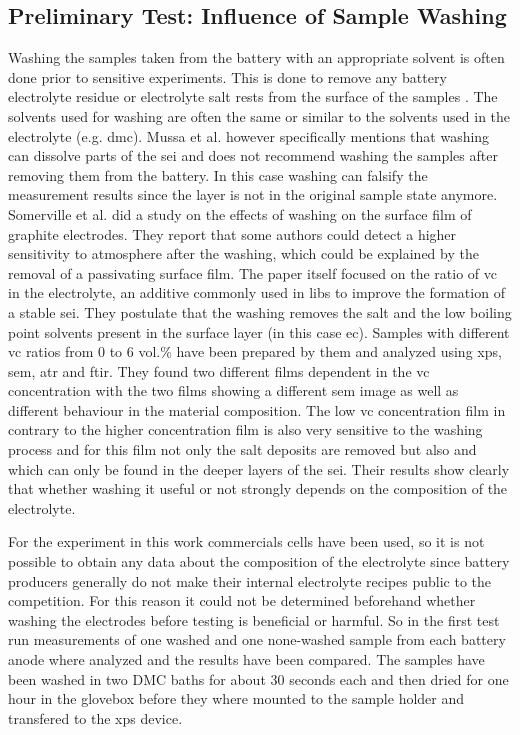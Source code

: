 \subsection{Preliminary Test: Influence of Sample Washing} 
Washing the samples taken from the battery with an appropriate solvent is often done prior to sensitive experiments. This is done to remove any battery electrolyte residue or electrolyte salt rests from the surface of the samples \cite{Yang.2010}. The solvents used for washing are often the same or similar to the solvents used in the electrolyte (e.g. \gls{dmc}). Mussa et al. however specifically mentions that washing can dissolve parts of the \gls{sei} and  does not recommend washing the samples after removing them from the battery. In this case washing can falsify the measurement results since the layer is not in the original sample state anymore. Somerville et al. \cite{Somerville.2016} did a study on the effects of washing on the surface film of graphite electrodes. They report that some authors could detect a higher sensitivity to atmosphere after the washing, which could be explained by the removal of a passivating surface film. The paper itself focused on the ratio of \gls{vc} in the electrolyte, an additive commonly used in \glspl{lib} to improve the formation of a stable \gls{sei}. They postulate that the washing removes the salt and the low boiling point solvents present in the surface layer (in this case \gls{ec}). Samples with different \gls{vc} ratios from 0 to 6 vol.\% have been prepared by them and analyzed using \gls{xps}, \gls{sem}, \gls{atr} and \gls{ftir}. They found two different films dependent in the \gls{vc} concentration with the two films showing a different \gls{sem} image as well as different behaviour in the material composition. The low \gls{vc} concentration film in contrary to the higher concentration film is also very sensitive to the washing process and for this film not only the salt deposits are removed but also  and  which can only be found in the deeper layers of the \gls{sei}. Their results show clearly that whether washing it useful or not strongly depends on the composition of the electrolyte. \par
For the experiment in this work commercials cells have been used, so it is not possible to obtain any data about the composition of the electrolyte since battery producers generally do not make their internal electrolyte recipes public to the competition. For this reason it could not be determined beforehand whether washing the electrodes before testing is beneficial or harmful. So in the first test run measurements of one washed and one none-washed sample from each battery anode where analyzed and the results have been compared. The samples have been washed in two DMC baths for about 30 seconds each and then dried for one hour in the glovebox before they where mounted to the sample holder and transfered to the \gls{xps} device.

